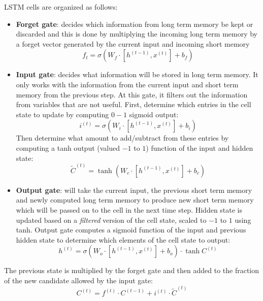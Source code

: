 LSTM cells are organized as follows:
\begin{itemize}
    \item \textbf{Forget gate}: decides which information from long term memory be kept or discarded 
        and this is done by multiplying the incoming long term memory by a forget vector generated by the
        current input and incoming short memory
        \begin{equation*}
            f_t = \sigma(W_f \cdot [h^{(t - 1)}, x^{(t)}] + b_f)
        \end{equation*}
    \item \textbf{Input gate}: decides what information will be stored in long term memory. It only 
        works with the information from the current input and short term memory from the previous step. At 
        this gate, it filters out the information from variables that are not useful. First, determine which entries 
        in the cell state to update by computing $0 - 1$ sigmoid output:
        \begin{equation*}
            i^{(t)} = \sigma(W_i \cdot [h^{(t - 1)}, x^{(t)}] + b_i)
        \end{equation*}
        Then determine what amount to add/subtract from these entries by computing a tanh output (valued $-1$ to $1$) 
        function of the input and hidden state:
        \begin{equation*}
            \tilde{C}^{(t)} = \tanh(W_c \cdot [h^{(t - 1)}, x^{(t)}] + b_c)
        \end{equation*}
    \item \textbf{Output gate}: will take the current input, the previous short term memory and newly
        computed long term memory to produce new short term memory which will be passed on to the cell in the 
        next time step. Hidden state is updated based on a \textit{filtered} version of the cell state, scaled
        to $- 1$ to $1$ using tanh. Output gate computes a sigmoid function of the input and previous hidden
        state to determine which elements of the cell state to output:
        \begin{equation*}
            h^{(t)} = \sigma(W_o \cdot [h^{(t - 1)}, x^{(t)}] + b_o) \cdot \tanh C^{(t)}
        \end{equation*}
\end{itemize}

The previous state is multiplied by the forget gate and then added to the fraction of the new candidate allowed by 
the input gate:
\begin{equation}
    C^{(t)} = f^{(t)} \cdot C^{(t - 1)} + i^{(t)} \cdot \tilde{C}^{(t)}
\end{equation}


